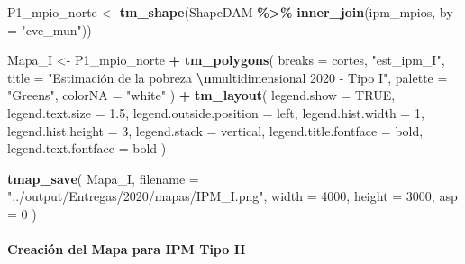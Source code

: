 \documentclass[
  12pt,
]{book}
\newenvironment{Shaded}{\begin{snugshade}}{\end{snugshade}}
\newcommand{\AttributeTok}[1]{\textcolor[rgb]{0.13,0.29,0.53}{#1}}
\newcommand{\ConstantTok}[1]{\textcolor[rgb]{0.56,0.35,0.01}{#1}}
\newcommand{\DecValTok}[1]{\textcolor[rgb]{0.00,0.00,0.81}{#1}}
\newcommand{\FloatTok}[1]{\textcolor[rgb]{0.00,0.00,0.81}{#1}}
\newcommand{\FunctionTok}[1]{\textcolor[rgb]{0.13,0.29,0.53}{\textbf{#1}}}
\newcommand{\NormalTok}[1]{#1}
\newcommand{\OtherTok}[1]{\textcolor[rgb]{0.56,0.35,0.01}{#1}}
\newcommand{\SpecialCharTok}[1]{\textcolor[rgb]{0.81,0.36,0.00}{\textbf{#1}}}
\newcommand{\StringTok}[1]{\textcolor[rgb]{0.31,0.60,0.02}{#1}}
\begin{document}
\begin{Shaded}
\begin{Highlighting}[]
\NormalTok{P1\_mpio\_norte }\OtherTok{\textless{}{-}}
  \FunctionTok{tm\_shape}\NormalTok{(ShapeDAM }\SpecialCharTok{\%\textgreater{}\%}
             \FunctionTok{inner\_join}\NormalTok{(ipm\_mpios, }\AttributeTok{by =} \StringTok{"cve\_mun"}\NormalTok{))}

\NormalTok{Mapa\_I }\OtherTok{\textless{}{-}}
\NormalTok{  P1\_mpio\_norte }\SpecialCharTok{+} \FunctionTok{tm\_polygons}\NormalTok{(}
    \AttributeTok{breaks =}\NormalTok{ cortes,}
    \StringTok{"est\_ipm\_I"}\NormalTok{,}
    \AttributeTok{title =} \StringTok{"Estimación de la pobreza }\SpecialCharTok{\textbackslash{}n}\StringTok{multidimensional 2020 {-} Tipo I"}\NormalTok{,}
    \AttributeTok{palette =} \StringTok{"Greens"}\NormalTok{,}
    \AttributeTok{colorNA =} \StringTok{"white"}
\NormalTok{  ) }\SpecialCharTok{+} \FunctionTok{tm\_layout}\NormalTok{(}
    \AttributeTok{legend.show =} \ConstantTok{TRUE}\NormalTok{,}
    \AttributeTok{legend.text.size =} \FloatTok{1.5}\NormalTok{,}
    \AttributeTok{legend.outside.position =} \StringTok{\textquotesingle{}left\textquotesingle{}}\NormalTok{,}
    \AttributeTok{legend.hist.width =} \DecValTok{1}\NormalTok{,}
    \AttributeTok{legend.hist.height =} \DecValTok{3}\NormalTok{,}
    \AttributeTok{legend.stack =} \StringTok{\textquotesingle{}vertical\textquotesingle{}}\NormalTok{,}
    \AttributeTok{legend.title.fontface =} \StringTok{\textquotesingle{}bold\textquotesingle{}}\NormalTok{,}
    \AttributeTok{legend.text.fontface =} \StringTok{\textquotesingle{}bold\textquotesingle{}}
\NormalTok{  )}

\FunctionTok{tmap\_save}\NormalTok{(}
\NormalTok{  Mapa\_I,}
  \AttributeTok{filename =} \StringTok{"../output/Entregas/2020/mapas/IPM\_I.png"}\NormalTok{,}
  \AttributeTok{width =} \DecValTok{4000}\NormalTok{,}
  \AttributeTok{height =} \DecValTok{3000}\NormalTok{,}
  \AttributeTok{asp =} \DecValTok{0}
\NormalTok{)}
\end{Highlighting}
\end{Shaded}

\hypertarget{creaciuxf3n-del-mapa-para-ipm-tipo-ii}{%
\paragraph*{Creación del Mapa para IPM Tipo II}\label{creaciuxf3n-del-mapa-para-ipm-tipo-ii}}
\end{document}
